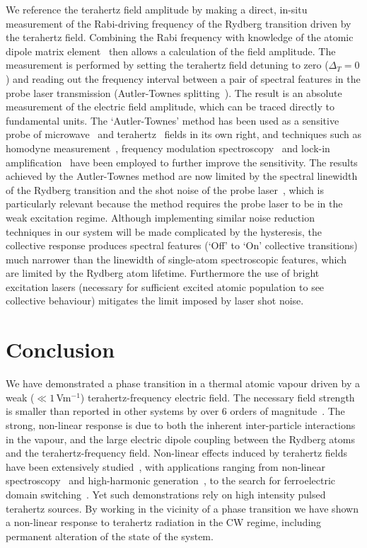 \documentclass[twocolumn,aps,prl,nobibnotes,8pt]{revtex4-1}
\begin{document}
We reference the terahertz field amplitude by making a direct, in-situ measurement of the Rabi-driving frequency of the Rydberg transition driven by the terahertz field.
Combining the Rabi frequency with knowledge of the atomic dipole matrix element~\cite{Sibalic17} then allows a calculation of the field amplitude. 
The measurement is performed by setting the terahertz field detuning to zero ($\Delta_T = 0$) and reading out the frequency interval between a pair of spectral features in the probe laser transmission (Autler-Townes splitting~\cite{Autler55}).
The result is an absolute measurement of the electric field amplitude, which can be traced directly to fundamental units. 
The `Autler-Townes' method has been used as a sensitive probe of microwave~\cite{Sedlacek12} and terahertz~\cite{Simons16} fields in its own right, and techniques such as homodyne measurement~\cite{Kumar2017b}, frequency modulation spectroscopy~\cite{Kumar2017a} and lock-in amplification~\cite{Sedlacek12} have been employed to further improve the sensitivity. 
The results achieved by the Autler-Townes method are now limited by the spectral linewidth of the Rydberg transition and the shot noise of the probe laser~\cite{Kumar2017a}, which is particularly relevant because the method requires the probe laser to be in the weak excitation regime. 
Although implementing similar noise reduction techniques in our system will be made complicated by the hysteresis, the collective response produces spectral features (`Off' to `On' collective transitions) much narrower than the linewidth of single-atom spectroscopic features, which are limited by the Rydberg atom lifetime. 
Furthermore the use of bright excitation lasers (necessary for sufficient excited atomic population to see collective behaviour) mitigates the limit imposed by laser shot noise.


\section{Conclusion}
\label{Conc}
\noindent
We have demonstrated a phase transition in a thermal atomic vapour driven by a weak ($\ll 1$\,Vm$^{-1}$) terahertz-frequency electric field.
The necessary field strength is smaller than reported in other systems by over 6 orders of magnitude~\cite{Liu12,Thompson15}. 
The strong, non-linear response is due to both the inherent inter-particle interactions in the vapour, and the large electric dipole coupling between the Rydberg atoms and the terahertz-frequency field. 
Non-linear effects induced by terahertz fields have been extensively studied~\cite{Leitenstorfer14}, with applications ranging from non-linear spectroscopy~\cite{Elsaesser15} and high-harmonic generation~\cite{Schubert14}, to the search for ferroelectric domain switching~\cite{Morimoto17}.
Yet such demonstrations rely on high intensity pulsed terahertz sources.
By working in the vicinity of a phase transition we have shown a non-linear response to terahertz radiation in the CW regime, including permanent alteration of the state of the system.
\end{document}
